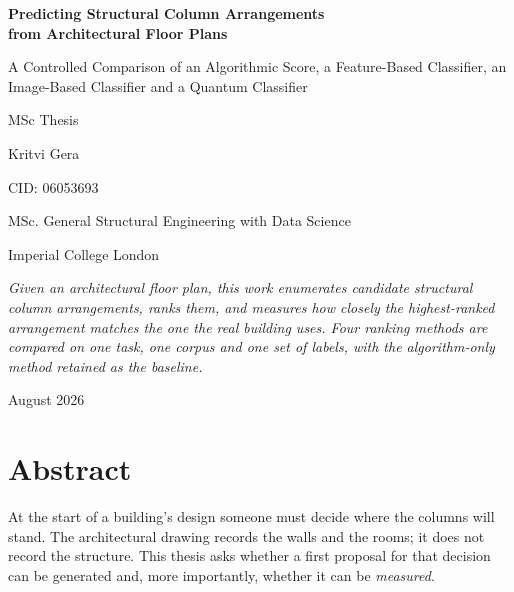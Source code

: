 \begin{titlepage}
\centering
\vspace*{2.2cm}

{\LARGE\bfseries Predicting Structural Column Arrangements\\[0.35em]
from Architectural Floor Plans\par}

\vspace{1.1cm}
{\large A Controlled Comparison of an Algorithmic Score, a Feature-Based
Classifier, an Image-Based Classifier and a Quantum Classifier\par}

\vspace{2.6cm}
{\large MSc Thesis\par}
\vspace{0.8cm}
{\large Kritvi Gera\par}
\vspace{0.2cm}
{\large CID: 06053693\par}
\vspace{0.2cm}
{\large MSc. General Structural Engineering with Data Science\par}
\vspace{0.4cm}
{\large Imperial College London\par}

\vspace{2.8cm}
\begin{minipage}{0.8\textwidth}
\centering\small
\textit{Given an architectural floor plan, this work enumerates candidate
structural column arrangements, ranks them, and measures how closely the
highest-ranked arrangement matches the one the real building uses. Four
ranking methods are compared on one task, one corpus and one set of
labels, with the algorithm-only method retained as the baseline.}
\end{minipage}

\vfill
{\normalsize August 2026\par}
\end{titlepage}


\chapter*{Abstract}

At the start of a building's design someone must decide where the columns
will stand. The architectural drawing records the walls and the rooms; it
does not record the structure. This thesis asks whether a first proposal
for that decision can be generated and, more importantly, whether it can
be \emph{measured}.

